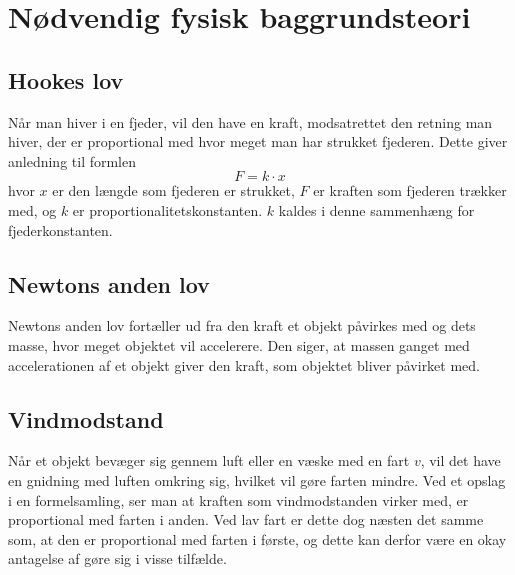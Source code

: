 \section{Nødvendig fysisk baggrundsteori}
\subsection{Hookes lov}\label{teori:Hooks lov}
Når man hiver i en fjeder, vil den have en kraft, modsatrettet den retning man hiver, der er proportional med hvor meget man har strukket fjederen. 
Dette giver anledning til formlen 
$$F =k\cdot x$$
hvor $x$ er den længde som fjederen er strukket, $F$ er kraften som fjederen trækker med, og $k$ er proportionalitetskonstanten. 
$k$ kaldes i denne sammenhæng for fjederkonstanten.

\subsection{Newtons anden lov}\label{teori:Newtons anden lov}
Newtons anden lov fortæller ud fra den kraft et objekt påvirkes med og dets masse, hvor meget objektet vil accelerere. 
Den siger, at massen ganget med accelerationen af et objekt giver den kraft, som objektet bliver påvirket med.

\subsection{Vindmodstand}\label{teori:vindmodstand}
Når et objekt bevæger sig gennem luft eller en væske med en fart $v$, vil det have en gnidning med luften omkring sig, hvilket vil gøre farten mindre.
Ved et opslag i en formelsamling, ser man at kraften som vindmodstanden virker med, er proportional med farten i anden. 
Ved lav fart er dette dog næsten det samme som, at den er proportional med farten i første, og dette kan derfor være en okay antagelse af gøre sig i visse tilfælde.

